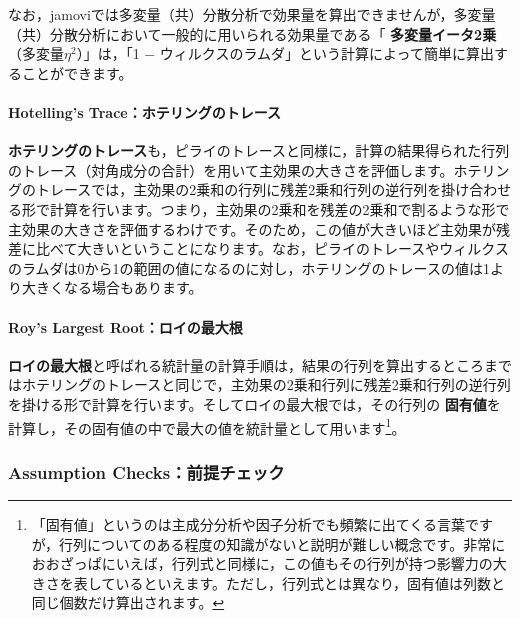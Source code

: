 \documentclass[
  12pt,
  a5jpaper,
  lualatex, ja=standard]{bxjsbook}
\renewcommand{\emph}[1]{\textbf{\color{emph} #1}}
\begin{document}
なお，jamoviでは多変量（共）分散分析で効果量を算出できませんが，多変量（共）分散分析において一般的に用いられる効果量である「\emph{多変量イータ2乗}（多変量\(\eta^2\)）」は，「1 − ウィルクスのラムダ」という計算によって簡単に算出することができます。

\hypertarget{hotellings-traceux30dbux30c6ux30eaux30f3ux30b0ux306eux30c8ux30ecux30fcux30b9}{%
\paragraph*{Hotelling's Trace：ホテリングのトレース}\label{hotellings-traceux30dbux30c6ux30eaux30f3ux30b0ux306eux30c8ux30ecux30fcux30b9}}

\emph{ホテリングのトレース}も，ピライのトレースと同様に，計算の結果得られた行列のトレース（対角成分の合計）を用いて主効果の大きさを評価します。ホテリングのトレースでは，主効果の2乗和の行列に残差2乗和行列の逆行列を掛け合わせる形で計算を行います。つまり，主効果の2乗和を残差の2乗和で割るような形で主効果の大きさを評価するわけです。そのため，この値が大きいほど主効果が残差に比べて大きいということになります。なお，ピライのトレースやウィルクスのラムダは0から1の範囲の値になるのに対し，ホテリングのトレースの値は1より大きくなる場合もあります。

\hypertarget{roys-largest-rootux30edux30a4ux306eux6700ux5927ux6839}{%
\paragraph*{Roy's Largest Root：ロイの最大根}\label{roys-largest-rootux30edux30a4ux306eux6700ux5927ux6839}}

\emph{ロイの最大根}と呼ばれる統計量の計算手順は，結果の行列を算出するところまではホテリングのトレースと同じで，主効果の2乗和行列に残差2乗和行列の逆行列を掛ける形で計算を行います。そしてロイの最大根では，その行列の\emph{固有値}を計算し，その固有値の中で最大の値を統計量として用います\footnote{「固有値」というのは主成分分析や因子分析でも頻繁に出てくる言葉ですが，行列についてのある程度の知識がないと説明が難しい概念です。非常におおざっぱにいえば，行列式と同様に，この値もその行列が持つ影響力の大きさを表しているといえます。ただし，行列式とは異なり，固有値は列数と同じ個数だけ算出されます。}。

\hypertarget{assumption-checksux524dux63d0ux30c1ux30a7ux30c3ux30af-1}{%
\subsubsection*{Assumption Checks：前提チェック}\label{assumption-checksux524dux63d0ux30c1ux30a7ux30c3ux30af-1}}
\end{document}
